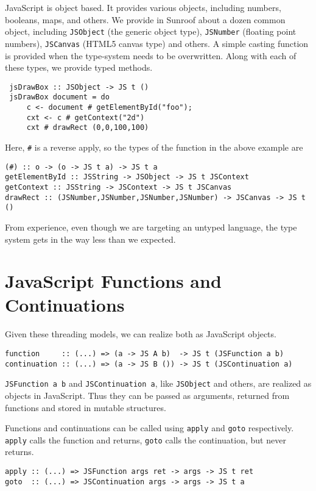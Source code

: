 \documentclass{llncs}
\newcommand{\Src}[1]{{\tt{#1}}}
\begin{document}
JavaScript is object based. It provides various objects,
including numbers, booleans, maps, and others. We
provide in Sunroof about a dozen common object,
including \Src{JSObject} (the generic object type), \Src{JSNumber}
(floating point numbers), \Src{JSCanvas} (HTML5 canvas type) 
and others. A simple
casting function is provided when the type-system
needs to be overwritten. Along with each of these types,
we provide typed methods.

\begin{verbatim}
 jsDrawBox :: JSObject -> JS t ()
 jsDrawBox document = do
     c <- document # getElementById("foo");
     cxt <- c # getContext("2d")
     cxt # drawRect (0,0,100,100)
\end{verbatim}

Here, \Src{\#} is a reverse apply, so the types
of the function in the above example are
\begin{verbatim}
(#) :: o -> (o -> JS t a) -> JS t a
getElementById :: JSString -> JSObject -> JS t JSContext
getContext :: JSString -> JSContext -> JS t JSCanvas
drawRect :: (JSNumber,JSNumber,JSNumber,JSNumber) -> JSCanvas -> JS t ()
\end{verbatim}        

From experience, even though we are targeting
an untyped language, the type system gets in the
way less than we expected.

\section{JavaScript Functions and Continuations}

Given these threading models, we can realize both as 
JavaScript objects. 
\begin{verbatim}
function     :: (...) => (a -> JS A b)  -> JS t (JSFunction a b)
continuation :: (...) => (a -> JS B ()) -> JS t (JSContinuation a)
\end{verbatim}

\Src{JSFunction a b} and \Src{JSContinuation a},
like \Src{JSObject} and others, are realized as objects
in JavaScript. Thus they can be passed as arguments, returned
from functions and stored in mutable structures.

Functions and continuations can be called using \Src{apply}
and \Src{goto} respectively. \Src{apply} calls the function
and returns, \Src{goto} calls the continuation, but never
returns.
\begin{verbatim}
apply :: (...) => JSFunction args ret -> args -> JS t ret
goto  :: (...) => JSContinuation args -> args -> JS t a
\end{verbatim}
\end{document}
